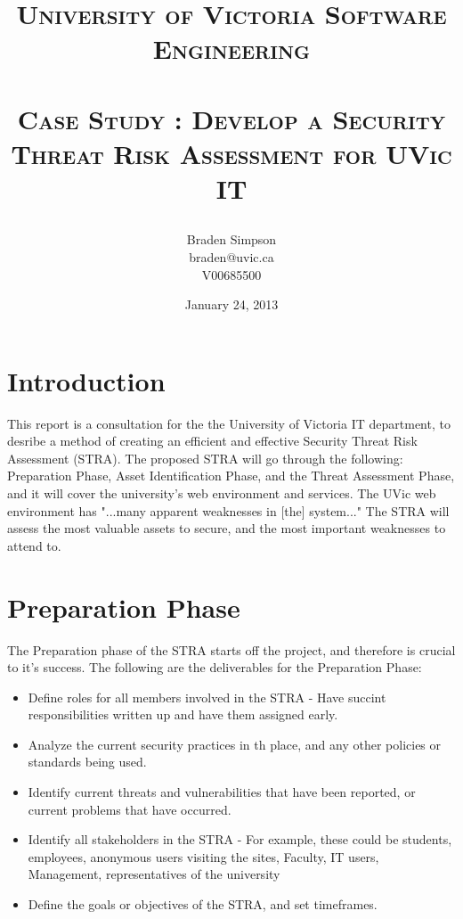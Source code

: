 \documentclass{article}
\title{
\large{\textsc{University of Victoria Software Engineering}}\huge\\ [0pt] %
\horrule{0.5pt}\\[0.4cm]
\textsc{Case Study : Develop a Security Threat Risk Assessment for UVic IT}\\
\author{Braden Simpson\\braden@uvic.ca\\V00685500}
\date{January 24, 2013}
}
\numberwithin{equation}{section} %
\numberwithin{figure}{section} %
\numberwithin{table}{section} %
\begin{document}
\maketitle %


\section{Introduction}
\label{sec:intro}
This report is a consultation for the the University of Victoria IT department, to desribe a method of creating an efficient and effective Security Threat Risk Assessment (STRA).  The proposed STRA will go through the following: Preparation Phase, Asset Identification Phase, and the Threat Assessment Phase, and it will cover the university's web environment and services.  The UVic web environment has "...many apparent weaknesses in [the] system..."\cite{caseStudy}  The STRA will assess the most valuable assets to secure, and the most important weaknesses to attend to.

\section{Preparation Phase}
The Preparation phase of the STRA starts off the project, and therefore is crucial to it's success.  The following are the deliverables for the Preparation Phase: 

\begin{itemize}
	\item Define roles for all members involved in the STRA - Have succint responsibilities written up and have them assigned early.  
	\item Analyze the current security practices in th place, and any other policies or standards being used. 
	\item Identify current threats and vulnerabilities that have been reported, or current problems that have occurred.
	\item Identify all stakeholders in the STRA - For example, these could be students, employees, anonymous users visiting the sites, Faculty, IT users, Management, representatives of the university
	\item Define the goals or objectives of the STRA, and set timeframes.
\end{itemize}
\end{document}
